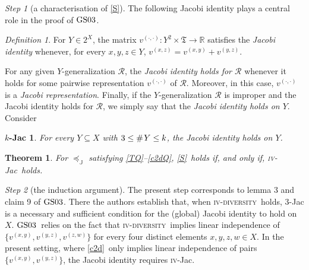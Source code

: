 \documentclass[ecta,nameyear,draft]{econsocart}
\newcommand{\countof}{\mathbin{\#}\hskip1pt}
\newcommand{\R}{\mathbb R}
\newcommand{\mc}{\mathcal}
\newcommand{\ext}{\mathrel{\mc R}}
\newcommand{\mbbt}{{\mathds {T}}}
\newcommand{\mbbtpp}{{\mathfrak{T}}}
\newcommand{\mbbj}{\mathds J}
\newcommand{\xy}{{(x, y)}}
\newcommand{\yz}{{(y,z)}}
\newcommand{\xz}{{(x,z)}}
\newcommand{\zw}{(z,w)}
\newcommand{\dd}{{(\cdot,\cdot)}}
\newcommand{\stability}{\ref{S}}
\newcommand{\fourdiv}{\textsc{iv}-\textsc{diversity}}
\newcommand{\fourjac}{\textup{\textsc{iv}-Jac}}
\newcommand{\gsii}{$\textup{GS03}$}
\theoremstyle{plain}
\newtheorem{theorem}{Theorem}%
\newtheorem{corollary}{Corollary}[theorem]
\newtheorem*{k-jac*}{$k$-Jac}
\theoremstyle{remark}
\newtheorem{step}{Step}[section]
\newtheorem*{definition*}{Definition}
\begin{document}
\begin{appendix}
  \begin{step}[a characterisation of \stability] \label{step-stability} The
    following Jacobi identity plays a central role in the proof of \gsii.
    \begin{definition*}%
      For $Y \in 2^{X}$, the matrix $v^{\dd} : Y^{2}\times \mbbtpp \rightarrow
      \R$ satisfies the \emph{Jacobi identity} whenever, for every $x , y , z
      \in Y$, $v^{\xz} = v^{\xy} + v^{\yz}$.
    \end{definition*}
    For any given $Y$-generalization $\ext$, the \emph{Jacobi identity holds
    for $\ext$} whenever it holds for some pairwise representation $v^{\dd}$ of
    $\ext$. Moreover, in this case, $v^{\dd}$ is a \emph{Jacobi
    representation}. Finally, if the $Y$-generalization $\ext$ is improper
    and the Jacobi identity holds for $\ext$, we simply say that the
    \emph{Jacobi identity holds on $Y$}.  Consider
    \begin{k-jac*}
      For every $Y \subseteq X$ with $3 \leq \countof Y \leq k$, the Jacobi
      identity holds on $Y$.
    \end{k-jac*}
    \begin{theorem}\label{thm-foureq} For $\preceq_{\mbbj}$ satisfying
      \ref{TQ}--\ref{c2dQ}, \stability\ holds if, and only if, \fourjac\ holds.
    \end{theorem}
  \end{step}
  \begin{step}[the induction argument]\label{step-induction} The present step
    corresponds to lemma 3 and claim 9 of \gsii. There the authors establish
    that, when \fourdiv\ holds, $3$-Jac is a necessary and sufficient condition
    for the (global) Jacobi identity to hold on $X$.  \gsii\ relies on the fact
    that \fourdiv\ implies linear independence of $\{v^{\xy},v^{\yz},
    v^{\zw}\}$ for every four distinct elements $x,y,z,w \in X$. In the present
    setting, where \ref{c2d}\ only implies linear independence of pairs
    $\{v^{\xy},v^{\yz}\}$, the Jacobi identity requires \fourjac.


\end{step}
\end{appendix}
\end{document}
